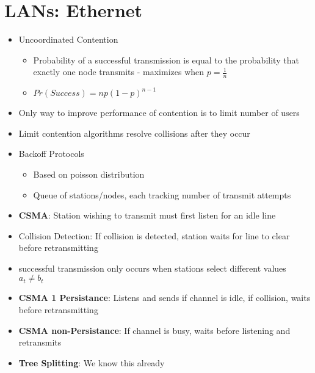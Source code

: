 \documentclass{article}
\begin{document}
    \section{LANs: Ethernet}
    \begin{itemize}
        \item Uncoordinated Contention
        \begin{itemize}
            \item Probability of a successful transmission is equal to the probability that exactly one node transmits - maximizes when $p=\frac{1}{n}$
            \item $Pr(Success) = np(1-p)^{n-1}$
        \end{itemize}
        \item Only way to improve performance of contention is to limit number of users
        \item Limit contention algorithms resolve collisions after they occur
        \item Backoff Protocols
        \begin{itemize}
            \item Based on poisson distribution
            \item Queue of stations/nodes, each tracking number of transmit attempts
        \end{itemize}
        \item \textbf{CSMA}: Station wishing to transmit must first listen for an idle line
        \item Collision Detection: If collision is detected, station waits for line to clear before retransmitting
        \item successful transmission only occurs when stations select different values $a_t \neq b_t$
        \item \textbf{CSMA 1 Persistance}: Listens and sends if channel is idle, if collision, waits before retransmitting
        \item \textbf{CSMA non-Persistance}: If channel is busy, waits before listening and retransmits
        \item \textbf{Tree Splitting}: We know this already
    \end{itemize}
\end{document}
